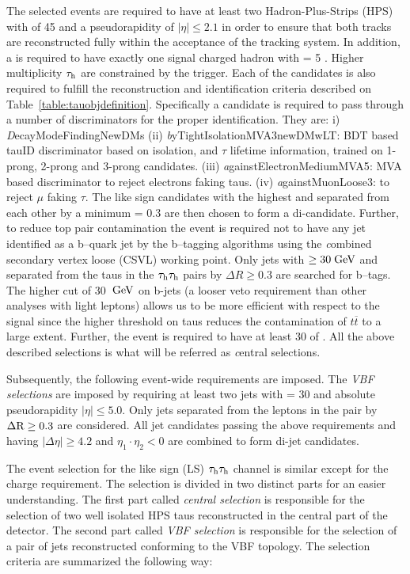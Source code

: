 The selected events are required to have at least two Hadron-Plus-Strips (HPS) \hadtau with \pt of 45 \gev and a pseudorapidity of $|\eta| \le 2.1$ in order to ensure that both tracks are reconstructed fully within the acceptance of the tracking system. In addition, a \hadtau is required to have exactly one signal charged hadron with \pt = 5 \gev. Higher multiplicity $\tau_{\text{h}}$ are constrained by the trigger. Each of the \hadtau candidates is also required to fulfill the reconstruction and identification criteria described on Table~\ref{table:tauobjdefinition}. Specifically a \hadtau candidate is required to pass through a number of discriminators for the proper identification. They are:
i) {\textit DecayModeFindingNewDMs} (ii) {\textit byTightIsolationMVA3newDMwLT}: BDT based tauID discriminator based on isolation, \pt and $\tau$ lifetime information, trained on 1-prong, 2-prong and 3-prong \hadtau candidates. (iii) {\textit againstElectronMediumMVA5}: MVA based discriminator to reject electrons faking taus. (iv) {\textit againstMuonLoose3}: to reject $\mu$ faking $\tau$. The like sign \hadtau candidates with the highest \pt and separated from each other by a minimum \deltar = 0.3 are then chosen to form a di-\hadtau candidate. 
Further, to reduce top pair contamination the event is required not to have any jet identified as a b--quark jet by the b--tagging algorithms using the {\textit combined secondary vertex loose} (CSVL) working point. Only jets with \pt $\ge 30 \;\text{Ge}\kern-0.06667em\text{V}$ and separated from the taus in the $\tau_{\text{h}}\tau_{\text{h}}$ pairs by $\Delta R \ge 0.3$ are searched for b--tags. The higher \pt cut of 30 $\;\text{Ge}\kern-0.06667em\text{V}$ on b-jets (a looser veto requirement than other analyses with light leptons) allows us to be more efficient with respect to the signal since the higher \pt threshold on taus reduces the contamination of $t\overline{t}$ to a large extent. Further, the event is required to have at least 30 \gev of \met. All the above described selections is what will be referred as {\textit central selections}.

Subsequently, the following event-wide requirements are imposed. The {\textit {VBF selections}} are imposed by requiring at least two jets with \pt = 30 \gev and absolute pseudorapidity $|\eta| \le 5.0$. Only jets separated from the leptons in the \hadtau\hadtau pair by $\Delta \text{R} \ge 0.3$ are considered. All jet candidates passing the above requirements and having $\vert \Delta\eta \vert \ge 4.2$ and $\eta_{1}\cdot\eta_{2} < 0$ are combined to form di-jet candidates.

The event selection for the like sign (LS) $\tau_{\text{h}}\tau_{\text{h}}$ channel is similar except for the charge requirement. The selection is divided in two distinct parts for an easier understanding. The first part called \textit{central selection} is responsible for the selection of two well isolated HPS taus reconstructed in the central part of the detector. The second part called \textit{VBF selection} is responsible for the selection of a pair of jets reconstructed conforming to the VBF topology. The selection criteria are summarized the following way:

